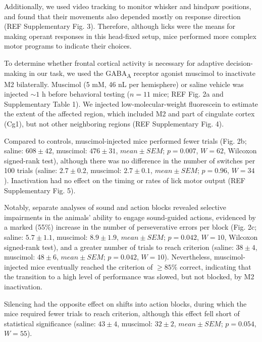 Additionally, we used video tracking to monitor whisker and hindpaw positions, and found that their movements also depended mostly on response direction (REF Supplementary Fig. 3). Therefore, although licks were the means for making operant responses in this head-fixed setup, mice performed more complex motor programs to indicate their choices.

To determine whether frontal cortical activity is necessary for adaptive decision-making in our task, we used the GABA\textsubscript{A} receptor agonist muscimol to inactivate M2 bilaterally. Muscimol (5 mM, 46 nL per hemisphere) or saline vehicle was injected $\sim 1$ h before behavioral testing ($n = 11$ mice; REF Fig. 2a and Supplementary Table 1). We injected low-molecular-weight fluorescein to estimate the extent of the affected region, which included M2 and part of cingulate cortex (Cg1), but not other neighboring regions (REF Supplementary Fig. 4).


Compared to controls, muscimol-injected mice performed fewer trials (Fig. 2b; saline: $608 \pm 42$, muscimol: $476 \pm 31$, $mean \pm SEM$; $p = 0.007$, $W = 62$, Wilcoxon signed-rank test), although there was no difference in the number of switches per 100 trials (saline: $2.7 \pm 0.2$, muscimol: $2.7 \pm 0.1$, $mean \pm SEM$; $p = 0.96$, $W = 34$). Inactivation had no effect on the timing or rates of lick motor output (REF Supplementary Fig. 5). 

Notably, separate analyses of sound and action blocks revealed selective impairments in the animals' ability to engage sound-guided actions, evidenced by a marked (55\%) increase in the number of perseverative errors per block (Fig. 2c; saline: $5.7 \pm 1.1$, muscimol: $8.9 \pm 1.9$, $mean \pm SEM$; $p = 0.042$, $W = 10$, Wilcoxon signed-rank test), and a greater number of trials to reach criterion (saline: $38 \pm 4$, muscimol: $48 \pm 6$, $mean \pm SEM$; $p = 0.042$, $W = 10$). Nevertheless, muscimol-injected mice eventually reached the criterion of $\ge 85\%$ correct, indicating that the transition to a high level of performance was slowed, but not blocked, by M2 inactivation. 

Silencing had the opposite effect on shifts into action blocks, during which the mice required fewer trials to reach criterion, although this effect fell short of statistical significance (saline: $43 \pm 4$, muscimol: $32 \pm 2$, $mean \pm SEM$; $p = 0.054$, $W = 55$). 


